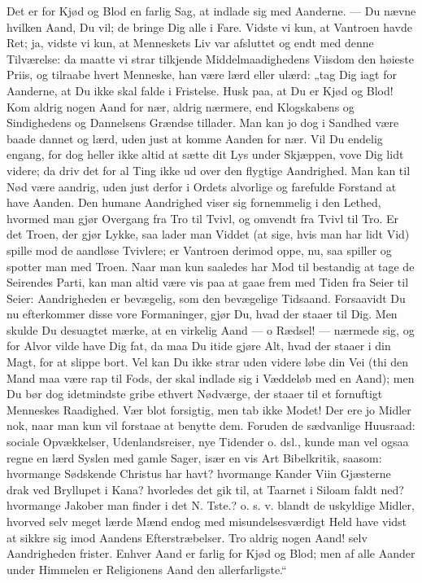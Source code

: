 \documentclass[12pt,a4paper]{book}
\begin{document}
Det er for Kjød og Blod en farlig Sag, at indlade sig med Aanderne. --- Du nævne hvilken
Aand, Du vil; de bringe Dig alle i Fare. Vidste vi kun, at Vantroen havde Ret; ja,
vidste vi kun, at Menneskets Liv var afsluttet og endt med denne Tilværelse: da maatte
vi strar tilkjende Middelmaadighedens Viisdom den høieste Priis, og tilraabe hvert
Menneske, han være lærd eller ulærd: „tag Dig iagt for Aanderne, at Du ikke skal falde i
Fristelse. Husk paa, at Du er Kjød og Blod! Kom aldrig nogen Aand for nær, aldrig
nærmere, end Klogskabens og Sindighedens og Dannelsens Grændse tillader. Man kan jo dog
i Sandhed være baade dannet og lærd, uden just at komme Aanden for nær. Vil Du endelig
engang, for dog heller ikke altid at sætte dit Lys under
Skjæppen, vove Dig lidt videre; da driv det for al Ting ikke ud over den flygtige
Aandrighed. Man kan til Nød være aandrig, uden just derfor i Ordets alvorlige og
farefulde Forstand at have Aanden. Den humane Aandrighed viser sig fornemmelig i den
Lethed, hvormed man gjør Overgang fra Tro til Tvivl, og omvendt fra Tvivl til Tro. Er
det Troen, der gjør Lykke, saa lader man Viddet (at sige, hvis man har lidt Vid) spille
mod de aandløse Tvivlere; er Vantroen derimod oppe, nu, saa spiller og spotter man med
Troen. Naar man kun saaledes har Mod til bestandig at tage de Seirendes Parti, kan man
altid være vis paa at gaae frem med Tiden fra Seier til Seier: Aandrigheden er bevægelig,
som den bevægelige Tidsaand. Forsaavidt Du nu efterkommer disse vore Formaninger, gjør
Du, hvad der staaer til Dig. Men skulde Du desuagtet mærke, at en virkelig Aand --- o
Rædsel! --- nærmede sig, og for Alvor vilde have Dig fat, da maa Du itide gjøre Alt,
hvad der staaer i din Magt, for at slippe bort. Vel kan Du ikke strar uden videre løbe
din Vei (thi den Mand maa være rap til Fods, der skal indlade sig i Væddeløb med en
Aand); men Du bør dog idetmindste gribe ethvert Nødværge, der staaer til et fornuftigt
Menneskes Raadighed. Vær blot forsigtig, men tab ikke Modet! Der ere jo Midler nok, naar
man kun vil forstaae at benytte dem. Foruden de sædvanlige Huusraad: sociale
Opvækkelser, Udenlandsreiser, nye Tidender o. dsl., kunde man vel ogsaa regne en lærd
Syslen med gamle Sager, især en vis Art Bibelkritik, saasom: hvormange Sødskende
Christus har havt? hvormange Kander Viin Gjæsterne drak ved Bryllupet i Kana? hvorledes
det gik til, at Taarnet i Siloam faldt ned? hvormange Jakober man finder i det N. Tste.?
o. s. v. blandt de uskyldige Midler, hvorved selv meget lærde Mænd endog med
misundelsesværdigt Held have vidst at sikkre sig imod Aandens Efterstræbelser. Tro
aldrig nogen
Aand! selv Aandrigheden frister. Enhver Aand er farlig for Kjød og Blod; men af alle
Aander under Himmelen er Religionens Aand den allerfarligste.“
\end{document}
